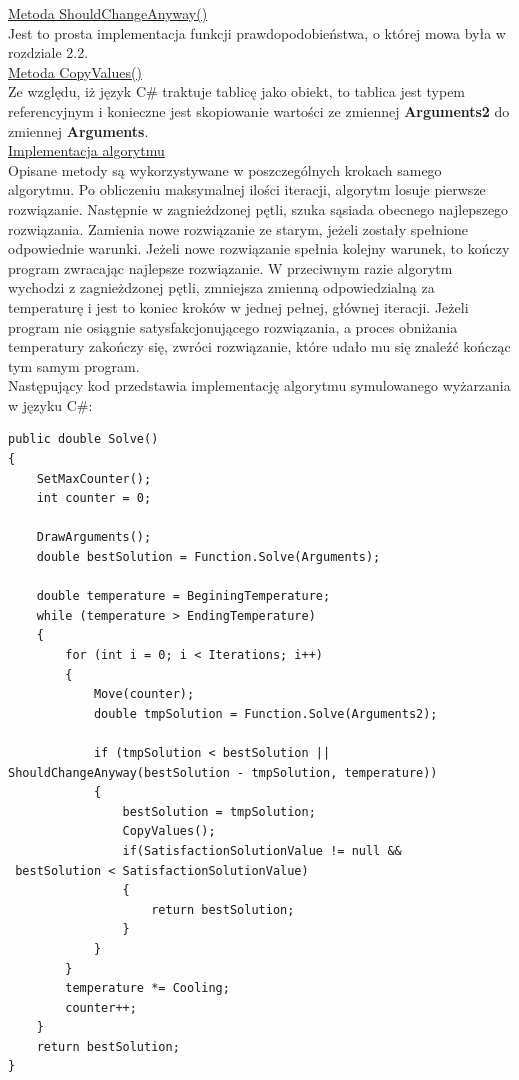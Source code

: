 \documentclass[twoside]{projektInzynierskiMS1}
\newcommand{\si}{ś}
\begin{document}
\underline{Metoda ShouldChangeAnyway()} \\
Jest to prosta implementacja funkcji prawdopodobieństwa, o której mowa była w rozdziale 2.2. \\

\underline{Metoda CopyValues()} \\
Ze względu, iż język C\# traktuje tablicę jako obiekt, to tablica jest typem referencyjnym i konieczne jest skopiowanie warto\si ci ze zmiennej \textbf{Arguments2} do zmiennej \textbf{Arguments}. \\

\underline{Implementacja algorytmu} \\
Opisane metody są wykorzystywane w poszczególnych krokach samego algorytmu. Po obliczeniu maksymalnej ilo\si ci iteracji, algorytm losuje pierwsze rozwiązanie. Następnie w zagnieżdzonej pętli, szuka sąsiada obecnego najlepszego rozwiązania. Zamienia nowe rozwiązanie ze starym, jeżeli zostały spełnione odpowiednie warunki. Jeżeli nowe rozwiązanie spełnia kolejny warunek, to kończy program zwracając najlepsze rozwiązanie. W przeciwnym razie algorytm wychodzi z zagnieżdzonej pętli, zmniejsza zmienną odpowiedzialną za temperaturę i jest to koniec kroków w jednej pełnej, głównej iteracji. Jeżeli program nie osiągnie satysfakcjonującego rozwiązania, a proces obniżania temperatury zakończy się, zwróci rozwiązanie, które udało mu się znaleźć kończąc tym samym program. \\Następujący kod przedstawia implementację algorytmu symulowanego wyżarzania w języku C\#:
\newpage
\begin{verbatim}
public double Solve()
{
    SetMaxCounter();
    int counter = 0;

    DrawArguments();
    double bestSolution = Function.Solve(Arguments);

    double temperature = BeginingTemperature;
    while (temperature > EndingTemperature)
    {
        for (int i = 0; i < Iterations; i++)
        {
            Move(counter);
            double tmpSolution = Function.Solve(Arguments2);

            if (tmpSolution < bestSolution || 
ShouldChangeAnyway(bestSolution - tmpSolution, temperature))
            {
                bestSolution = tmpSolution;
                CopyValues();
                if(SatisfactionSolutionValue != null &&
 bestSolution < SatisfactionSolutionValue)
                {
                    return bestSolution;
                }
            }
        }
        temperature *= Cooling;
        counter++;
    }
    return bestSolution;
}
\end{verbatim}
\end{document}
